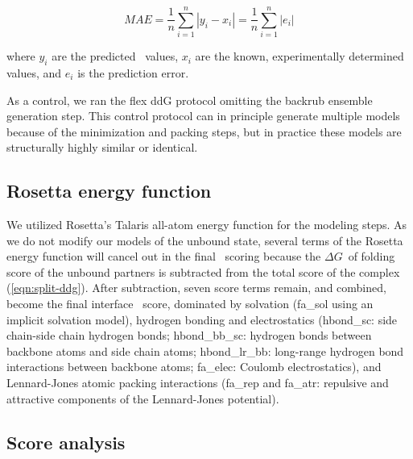 \begin{equation}\label{eqn:mae}
  MAE = \dfrac{1}{n}\sum\limits_{i=1}^n|y_i-x_i| = \dfrac{1}{n}\sum\limits_{i=1}^n|e_i|
\end{equation}

where $y_i$ are the predicted \ddg\ values, $x_i$ are the known, experimentally determined values, and $e_i$ is the prediction error.

As a control, we ran the flex ddG protocol omitting the backrub ensemble generation step.
This control protocol can in principle generate multiple models because of the minimization and packing steps, but in practice these models are structurally highly similar or identical.

\subsection{Rosetta energy function}

We utilized Rosetta's Talaris\cite{song_structure-guided_2011,shapovalov_smoothed_2011,omeara_combined_2015} all-atom energy function for the modeling steps.
As we do not modify our models of the unbound state, several terms of the Rosetta energy function will cancel out in the final \ddg\ scoring because the $\Delta G$\ of folding score of the unbound partners is subtracted from the total score of the complex (\cref{eqn:split-ddg}).
After subtraction, seven score terms remain, and combined, become the final interface \ddg\ score, dominated by solvation (fa\_sol using an implicit solvation model\cite{lazaridis_effective_1999}), hydrogen bonding and electrostatics\cite{kortemme_orientation-dependent_2003,song_structure-guided_2011,omeara_combined_2015} (hbond\_sc: side chain-side chain hydrogen bonds; hbond\_bb\_sc: hydrogen bonds between backbone atoms and side chain atoms; hbond\_lr\_bb: long-range hydrogen bond interactions between backbone atoms; fa\_elec: Coulomb electrostatics), and Lennard-Jones atomic packing interactions (fa\_rep and fa\_atr: repulsive and attractive components of the Lennard-Jones potential).

\subsection{Score analysis}


